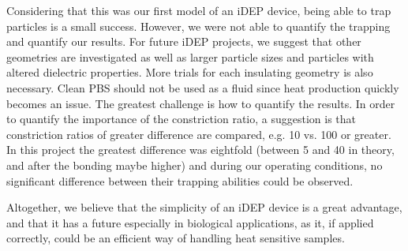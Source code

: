 \documentclass[journal, a4paper]{IEEEtran}
\begin{document}
Considering that this was our first model of an iDEP device, being able to trap particles is a small success. However, we were not able to quantify the trapping and quantify our results. For future iDEP projects, we suggest that other geometries are investigated as well as larger particle sizes and particles with altered dielectric properties. More trials for each insulating geometry is also necessary. Clean PBS should not be used as a fluid since heat production quickly becomes an issue. The greatest challenge is how to quantify the results. In order to quantify the importance of the constriction ratio, a suggestion is that constriction ratios of greater difference are compared, e.g. 10 vs. 100 or greater. In this project the greatest difference was eightfold (between 5 and 40 in theory, and after the bonding maybe higher) and during our operating conditions, no significant difference between their trapping abilities could be observed.

Altogether, we believe that the simplicity of an iDEP device is a great advantage, and that it has a future especially in biological applications, as it, if applied correctly, could be an efficient way of handling heat sensitive samples.



\end{document}
